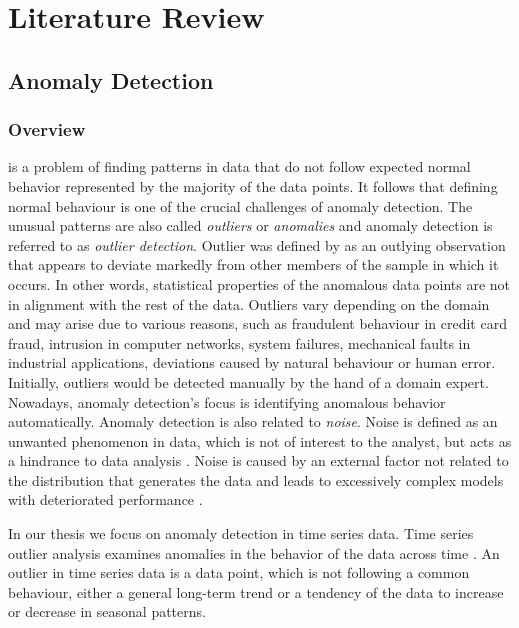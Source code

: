 \chapter{Literature Review}

\section{Anomaly Detection}
\label{section:anomalyDetectionLiteratureReview}
\subsection{Overview}

 is a problem of finding patterns in data that do not follow expected normal behavior represented by the majority of the data points. It follows that defining normal behaviour is one of the crucial challenges of anomaly detection. The unusual patterns are also called \textit{outliers} or \textit{anomalies} and anomaly detection is referred to as \textit{outlier detection}. Outlier was defined by \cite{ORD1996175} as an outlying observation that appears to deviate markedly from other members of the sample in which it occurs. In other words, statistical properties of the anomalous data points are not in alignment with the rest of the data. Outliers vary depending on the domain and may arise due to various reasons, such as fraudulent behaviour in credit card fraud, intrusion in computer networks, system failures, mechanical faults in industrial applications, deviations caused by natural behaviour or human error. Initially, outliers would be detected manually by the hand of a domain expert. Nowadays, anomaly detection's focus is identifying anomalous behavior automatically. Anomaly detection is also related to \textit{noise}. Noise is defined as an unwanted phenomenon in data, which is not of interest to the analyst, but acts as a hindrance to data analysis \cite{cvbakv2009}. Noise is  caused by an external factor not related to the distribution that generates the data \cite{ggh2017} and leads to excessively complex models with deteriorated performance \cite{wu2007}. 

In our thesis we focus on anomaly detection in time series data. Time series outlier analysis examines anomalies in the behavior of the data across time \cite{gupta2014}. An outlier in time series data is a data point, which is not following a common behaviour, either a general long-term trend or a tendency of the data to increase or decrease in seasonal patterns. 

